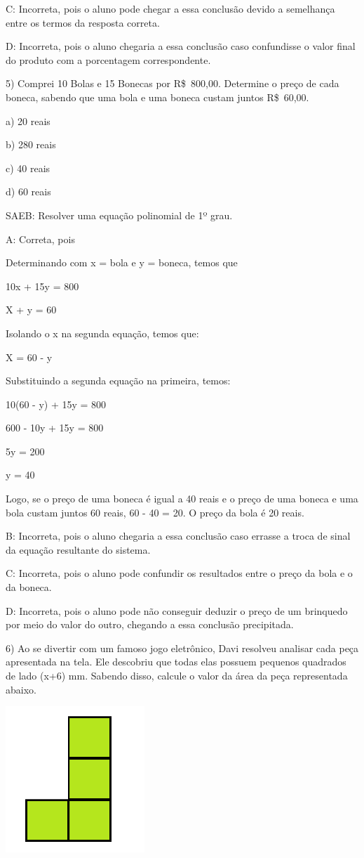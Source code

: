 C: Incorreta, pois o aluno pode chegar a essa conclusão devido a
semelhança entre os termos da resposta correta.

D: Incorreta, pois o aluno chegaria a essa conclusão caso confundisse o
valor final do produto com a porcentagem correspondente.

5) Comprei 10 Bolas e 15 Bonecas por R\$~800,00. Determine o preço de
cada boneca, sabendo que uma bola e uma boneca custam juntos R\$~60,00.

a) 20 reais

b) 280 reais

c) 40 reais

d) 60 reais

SAEB: Resolver uma equação polinomial de 1º grau.

A: Correta, pois

Determinando com x = bola e y = boneca, temos que

10x + 15y = 800

X + y = 60

Isolando o x na segunda equação, temos que:

X = 60 - y

Substituindo a segunda equação na primeira, temos:

10(60 - y) + 15y = 800

600 - 10y + 15y = 800

5y = 200

y = 40

Logo, se o preço de uma boneca é igual a 40 reais e o preço de uma
boneca e uma bola custam juntos 60 reais, 60 - 40 = 20. O preço da bola
é 20 reais.

B: Incorreta, pois o aluno chegaria a essa conclusão caso errasse a
troca de sinal da equação resultante do sistema.

C: Incorreta, pois o aluno pode confundir os resultados entre o preço da
bola e o da boneca.

D: Incorreta, pois o aluno pode não conseguir deduzir o preço de um
brinquedo por meio do valor do outro, chegando a essa conclusão
precipitada.

6) Ao se divertir com um famoso jogo eletrônico, Davi resolveu analisar
cada peça apresentada na tela. Ele descobriu que todas elas possuem
pequenos quadrados de lado (x+6) mm. Sabendo disso, calcule o valor da
área da peça representada abaixo.

\includegraphics[width=2.05833in,height=2.16573in]{./imgSAEB_8_MAT/media/image57.png}

